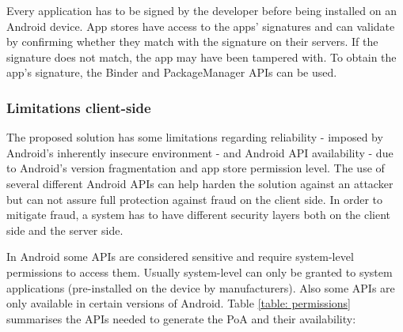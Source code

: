Every application has to be signed by the developer before being installed on an Android device. App 
stores have access to the apps' signatures and can validate by confirming whether they match with the 
signature on their servers. If the signature does not match, the app may have been tampered with. To obtain the app's signature, the Binder and PackageManager APIs can be used.

\subsubsection{Limitations client-side}

The proposed solution has some limitations regarding reliability - imposed by Android's inherently 
insecure environment - and Android API availability - due to Android's version fragmentation and app 
store permission level. The use of several different Android APIs can help harden the solution 
against an attacker but can not assure full protection against fraud on the client side. In order to 
mitigate fraud, a system has to have different security layers both on the client side and the server side. 

In Android some APIs are considered sensitive and require system-level permissions to access them. 
Usually system-level can only be granted to system applications (pre-installed on the device by 
manufacturers). Also some APIs are only available in certain versions of Android. Table \ref{table: permissions} summarises the APIs needed to generate the \textsf{PoA} and their availability:


